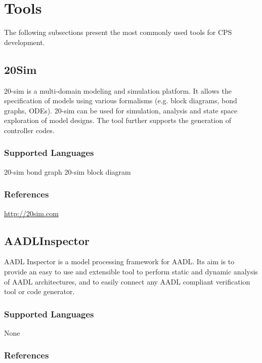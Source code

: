 \section{Tools}
\label{sec:tools}

The following subsections present the most commonly used tools for CPS development.

\subsection{20Sim}
\label{subsecT:20Sim}


20-sim is a multi-domain modeling and simulation platform. 
It allows the specification of models using various formalisms (e.g. block diagrams, bond graphs, ODEs).
20-sim can be used for simulation, analysis and state space exploration of model designs. 
The tool further supports the generation of controller codes.

\subsubsection{Supported Languages}

20-sim bond graph
20-sim block diagram


\subsubsection{References}
\url{http://20sim.com}




\subsection{AADLInspector}
\label{subsecT:AADLInspector}


AADL Inspector is a model processing framework for AADL. Its aim is to provide an easy to use and extensible tool to perform static and dynamic analysis of AADL architectures, and to easily connect any AADL compliant verification tool or code generator.

\subsubsection{Supported Languages}

None


\subsubsection{References}

